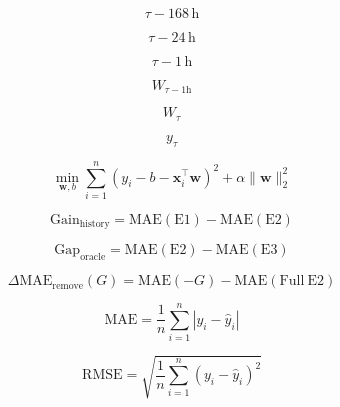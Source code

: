 \[ \tau - 168\,\mathrm{h} \]

\[ \tau - 24\,\mathrm{h} \]

\[ \tau - 1\,\mathrm{h} \]

\[ W_{\tau-1\mathrm{h}} \]

\[ W_\tau \]

\[ y_\tau \]

\[ \min_{\mathbf{w},b} \sum_{i=1}^{n} \left(y_i-b-\mathbf{x}_i^\top\mathbf{w}\right)^2 + \alpha\lVert\mathbf{w}\rVert_2^2 \]

\[ \mathrm{Gain}_{\mathrm{history}} = \mathrm{MAE}(\mathrm{E1}) - \mathrm{MAE}(\mathrm{E2}) \]

\[ \mathrm{Gap}_{\mathrm{oracle}} = \mathrm{MAE}(\mathrm{E2}) - \mathrm{MAE}(\mathrm{E3}) \]

\[ \Delta\mathrm{MAE}_{\mathrm{remove}}(G) = \mathrm{MAE}(-G) - \mathrm{MAE}(\mathrm{Full\ E2}) \]

\[ \mathrm{MAE} = \frac{1}{n} \sum_{i=1}^{n} \left|y_i-\hat{y}_i\right| \]

\[ \mathrm{RMSE} = \sqrt{ \frac{1}{n} \sum_{i=1}^{n} \left(y_i-\hat{y}_i\right)^2 } \]
